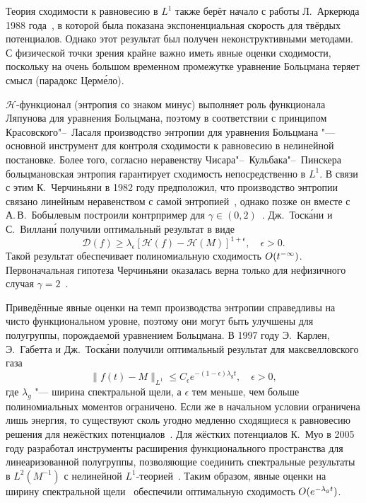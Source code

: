 Теория сходимости к равновесию в \(L^1\) также берёт начало с работы Л.~Аркерюда 1988 года~\cite{Arkeryd1988},
в которой была показана экспоненциальная скорость для твёрдых потенциалов.
Однако этот результат был получен неконструктивными методами.
С физической точки зрения крайне важно иметь явные оценки сходимости, поскольку на очень большом временном промежутке
уравнение Больцмана теряет смысл (парадокс Церм\'{е}ло).

\(\mathcal{H}\)-функционал (энтропия со знаком минус) выполняет роль функционала Ляпунова для уравнения Больцмана,
поэтому в соответствии с принципом Красовского"--~Ласаля производство энтропии для уравнения Больцмана
"--- основной инструмент для контроля сходимости к равновесию в нелинейной постановке.
Более того, согласно неравенству Чисара"--~Кульбака"--~Пинскера больцмановская энтропия
гарантирует сходимость непосредственно в \(L^1\).
В связи с этим К.~Черчиньяни в 1982 году предположил, что производство энтропии связано
линейным неравенством с самой энтропией~\cite{Cercignani1982, Desvillettes2011},
однако позже он вместе с А.\,В.~Бобылевым построили контрпример для \(\gamma\in(0,2)\)~\cite{Bobylev1999}.
Дж.~Тоск\'{а}ни и С.~Виллан\'{и} получили оптимальный результат в виде~\cite{Toscani1999, Toscani2000, Villani2003}
\begin{equation*}
    \mathcal{D}(f) \geq \lambda_\epsilon \left[ \mathcal{H}(f) - \mathcal{H}(M) \right]^{1+\epsilon},
    \quad \epsilon > 0.
\end{equation*}
Такой результат обеспечивает полиномиальную сходимость \(O(t^{-\infty})\).
Первоначальная гипотеза Черчиньяни оказалась верна только для нефизичного случая \(\gamma=2\)~\cite{Villani2003}.

Приведённые явные оценки на темп производства энтропии справедливы на чисто функциональном уровне,
поэтому они могут быть улучшены для полугруппы, порождаемой уравнением Больцмана.
В 1997 году Э.~Карлен, Э.~Габетта и Дж.~Тоск\'{а}ни получили оптимальный результат для максвелловского газа~\cite{Carlen1999}
\begin{equation*}
    \|f(t) - M\|_{L^1} \leq C_\epsilon e^{-(1-\epsilon)\lambda_g t}, \quad \epsilon > 0,
\end{equation*}
где \(\lambda_g\) "--- ширина спектральной щели, а \(\epsilon\) тем меньше,
чем больше полиномиальных моментов ограничено.
Если же в начальном условии ограничена лишь энергия, то существуют сколь угодно медленно сходящиеся к равновесию
решения для нежёстких потенциалов~\cite{Carlen2003, Carlen2009}.
Для жёстких потенциалов К.~Муо в 2005 году разработал инструменты расширения функционального пространства для линеаризованной полугруппы,
позволяющие соединить спектральные результаты в \(L^2(M^{-1})\) с нелинейной \(L^1\)-теорией~\cite{Mouhot2006}.
Таким образом, явные оценки на ширину спектральной щели~\cite{Baranger2005}
обеспечили оптимальную сходимость \(O(e^{-\lambda_g t})\).

